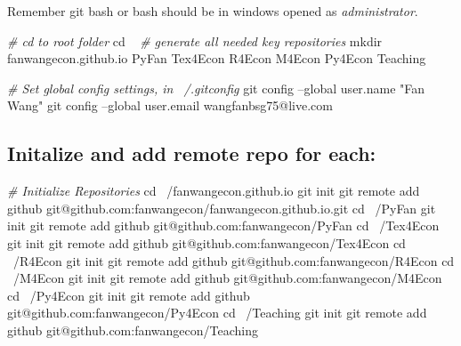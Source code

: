 \documentclass[]{article}
\newenvironment{Shaded}{\begin{snugshade}}{\end{snugshade}}
\newcommand{\BuiltInTok}[1]{#1}
\newcommand{\CommentTok}[1]{\textcolor[rgb]{0.56,0.35,0.01}{\textit{#1}}}
\newcommand{\FunctionTok}[1]{\textcolor[rgb]{0.00,0.00,0.00}{#1}}
\newcommand{\NormalTok}[1]{#1}
\newcommand{\StringTok}[1]{\textcolor[rgb]{0.31,0.60,0.02}{#1}}
\begin{document}
Remember git bash or bash should be in windows opened as
\emph{administrator}.

\begin{Shaded}
\begin{Highlighting}[]
\CommentTok{# cd to root folder}
\BuiltInTok{cd}\NormalTok{ ~}
\CommentTok{# generate all needed key repositories}
\FunctionTok{mkdir}\NormalTok{ fanwangecon.github.io PyFan Tex4Econ R4Econ M4Econ Py4Econ Teaching}

\CommentTok{# Set global config settings, in ~/.gitconfig}
\FunctionTok{git}\NormalTok{ config --global user.name }\StringTok{"Fan Wang"}
\FunctionTok{git}\NormalTok{ config --global user.email wangfanbsg75@live.com}
\end{Highlighting}
\end{Shaded}

\hypertarget{initalize-and-add-remote-repo-for-each}{%
\subsection{Initalize and add remote repo for
each:}\label{initalize-and-add-remote-repo-for-each}}

\begin{Shaded}
\begin{Highlighting}[]
\CommentTok{# Initialize Repositories}
\BuiltInTok{cd}\NormalTok{ ~/fanwangecon.github.io}
\FunctionTok{git}\NormalTok{ init}
\FunctionTok{git}\NormalTok{ remote add github git@github.com:fanwangecon/fanwangecon.github.io.git}
\BuiltInTok{cd}\NormalTok{ ~/PyFan}
\FunctionTok{git}\NormalTok{ init}
\FunctionTok{git}\NormalTok{ remote add github git@github.com:fanwangecon/PyFan}
\BuiltInTok{cd}\NormalTok{ ~/Tex4Econ}
\FunctionTok{git}\NormalTok{ init}
\FunctionTok{git}\NormalTok{ remote add github git@github.com:fanwangecon/Tex4Econ}
\BuiltInTok{cd}\NormalTok{ ~/R4Econ}
\FunctionTok{git}\NormalTok{ init}
\FunctionTok{git}\NormalTok{ remote add github git@github.com:fanwangecon/R4Econ}
\BuiltInTok{cd}\NormalTok{ ~/M4Econ}
\FunctionTok{git}\NormalTok{ init}
\FunctionTok{git}\NormalTok{ remote add github git@github.com:fanwangecon/M4Econ}
\BuiltInTok{cd}\NormalTok{ ~/Py4Econ}
\FunctionTok{git}\NormalTok{ init}
\FunctionTok{git}\NormalTok{ remote add github git@github.com:fanwangecon/Py4Econ}
\BuiltInTok{cd}\NormalTok{ ~/Teaching}
\FunctionTok{git}\NormalTok{ init}
\FunctionTok{git}\NormalTok{ remote add github git@github.com:fanwangecon/Teaching}
\end{Highlighting}
\end{Shaded}
\end{document}
